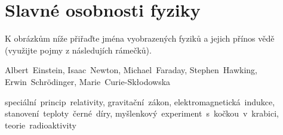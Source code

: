 \documentclass[crop=false]{standalone}
\begin{document}
\section*{Slavné osobnosti fyziky}
K obrázkům níže přiřaďte jména vyobrazených fyziků a jejich přínos vědě (využijte pojmy z následujích rámečků).

\begin{mdframed}[frametitle={Jména}, frametitlealignment=\center, ]
    \begin{center}
        Albert~Einstein, Isaac~Newton, Michael~Faraday, Stephen~Hawking, Erwin~Schrödinger, Marie~Curie-Skłodowska
    \end{center}
\end{mdframed}
\vspace{-0,2cm}
\begin{mdframed}[frametitle={Díla}, frametitlealignment=\center]
    \begin{center}
        speciální~princip~relativity, gravitační~zákon, elektromagnetická~indukce, stanovení~teploty~černé~díry, myšlenkový~experiment~s~kočkou~v~krabici, teorie~radioaktivity
    \end{center}
\end{mdframed}
\end{document}
